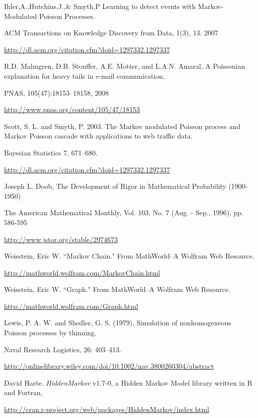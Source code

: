 \documentclass{report}
\begin{document}
\begin{thebibliography}{9}

 Ihler,A.,Hutchins,J.,\& Smyth,P Learning to detect events with Markov-Modulated Poisson Processes.

ACM Transactions on Knowledge Discovery from Data, 1(3), 13. 2007 

\url{http://dl.acm.org/citation.cfm?doid=1297332.1297337}

 R.D. Malmgren, D.B. Stouffer, A.E. Motter, and L.A.N. Amaral, A Poissonian explanation for heavy tails in e-mail communication, 

PNAS, 105(47):18153–18158, 2008 

\url{http://www.pnas.org/content/105/47/18153}

 Scott, S. L. and Smyth, P. 2003. The Markov modulated Poisson process and Markov Poisson cascade with applications to web traffic data.

Bayesian Statistics 7, 671–680. 

\url{http://dl.acm.org/citation.cfm?doid=1297332.1297337}

	Joseph L. Doob, The Development of Rigor in Mathematical Probability (1900-1950)

	The American Mathematical Monthly, Vol. 103, No. 7 (Aug. - Sep., 1996), pp. 586-595

	\url{http://www.jstor.org/stable/2974673}

	Weisstein, Eric W. ``Markov Chain." From MathWorld--A Wolfram Web Resource. 

	\url{http://mathworld.wolfram.com/MarkovChain.html}

	Weisstein, Eric W. ``Graph." From MathWorld--A Wolfram Web Resource. 
	
	\url{http://mathworld.wolfram.com/Graph.html}

	Lewis, P. A. W. and Shedler, G. S. (1979), Simulation of nonhomogeneous Poisson processes by thinning.

	Naval Research Logistics, 26: 403–413.

	\url{http://onlinelibrary.wiley.com/doi/10.1002/nav.3800260304/abstract}

	David Harte. \emph{HiddenMarkov} v1.7-0, a Hidden Markov Model library written in R and Fortran, 

	\url{http://cran.r-project.org/web/packages/HiddenMarkov/index.html}


\end{thebibliography}
\end{document}
